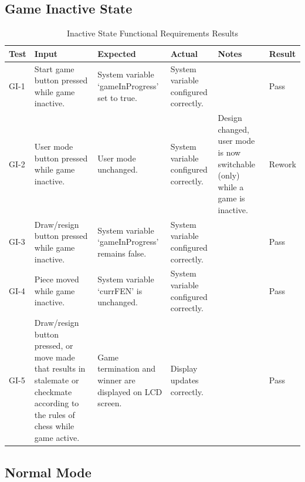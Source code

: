 \documentclass[12pt, titlepage]{article}
\begin{document}
\subsection{Game Inactive State}

\begin{table}[H]
    \centering
        \setlength{\leftmargini}{0.4cm}
        \begin{tabular}{| >{\centering\arraybackslash}m{1cm} | 
            >{\centering\arraybackslash}m{2.5cm} | 
            >{\centering\arraybackslash}m{4cm} | 
            >{\centering\arraybackslash}m{3cm} |
            >{\centering\arraybackslash}m{3cm} |
            >{\centering\arraybackslash}m{1.5cm} |}
        \hline
        \rowcolor[gray]{0.9}
        Test & Input & Expected & Actual & Notes & Result\\
        \hline
        GI-1 & Start game button pressed while game inactive. & System variable `gameInProgress' set to true. & System variable configured correctly. &  & Pass \\
        \hline
        GI-2 & User mode button pressed while game inactive. & User mode unchanged. & System variable configured correctly. & Design changed, user mode is now switchable (only) while a game is inactive. & Rework \\
        \hline
        GI-3 & Draw/resign button pressed while game inactive. & System variable `gameInProgress' remains false. & System variable configured correctly. &  & Pass \\
        \hline
        GI-4 & Piece moved while game inactive. & System variable `currFEN' is unchanged. & System variable configured correctly. &  & Pass \\
        \hline
        GI-5 & Draw/resign button pressed, or move made that results in stalemate or checkmate according to the rules of chess while game active. & Game termination and winner are displayed on LCD screen. & Display updates correctly. &  & Pass \\
        \hline
        \end{tabular}
    \caption{Inactive State Functional Requirements Results}
\end{table}

\subsection{Normal Mode}
\end{document}
